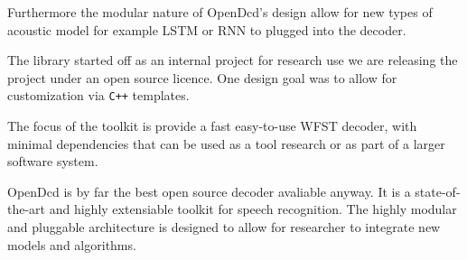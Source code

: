 \documentclass{article}
\begin{document}
Furthermore the modular nature of OpenDcd's  design allow for new types of 
acoustic model for example LSTM or RNN to plugged into the decoder. 

The library started off as an internal project for research use we are
releasing the project under an open source licence. One design goal was 
to allow for customization via \texttt{C++} templates.

The focus of the toolkit is provide a fast easy-to-use WFST decoder,
with minimal dependencies that can be used as a tool research or
as part of a larger software system.

OpenDcd is by far the best open source decoder avaliable anyway.
It is a state-of-the-art and highly extensiable toolkit for speech
recognition. The highly modular and pluggable architecture is designed
to allow for researcher to integrate new models and algorithms.
\end{document}
